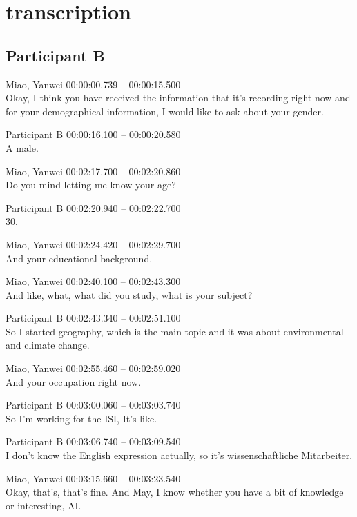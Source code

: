 \clearpage %

\chapter{transcription}
\label{appendix:transcription}

\section*{Participant B}

{\parindent0pt
\tiny
Miao, Yanwei 00:00:00.739 -- 00:00:15.500 \\
Okay, I think you have received the information that it's recording right now and for your demographical information, I would like to ask about your gender.

Participant B 00:00:16.100 -- 00:00:20.580 \\
A male.

Miao, Yanwei 00:02:17.700 -- 00:02:20.860 \\
Do you mind letting me know your age?

Participant B 00:02:20.940 -- 00:02:22.700 \\
30.

Miao, Yanwei 00:02:24.420 -- 00:02:29.700 \\
And your educational background.

Miao, Yanwei 00:02:40.100 -- 00:02:43.300 \\
And like, what, what did you study, what is your subject?

Participant B 00:02:43.340 -- 00:02:51.100 \\
So I started geography, which is the main topic and it was about environmental and climate change.

Miao, Yanwei 00:02:55.460 -- 00:02:59.020 \\
And your occupation right now.

Participant B 00:03:00.060 -- 00:03:03.740 \\
So I'm working for the ISI, It's like.

Participant B 00:03:06.740 -- 00:03:09.540 \\
I don't know the English expression actually, so it's wissenschaftliche Mitarbeiter.

Miao, Yanwei 00:03:15.660 -- 00:03:23.540 \\
Okay, that's, that's fine. And May, I know whether you have a bit of knowledge or interesting, AI.

}
